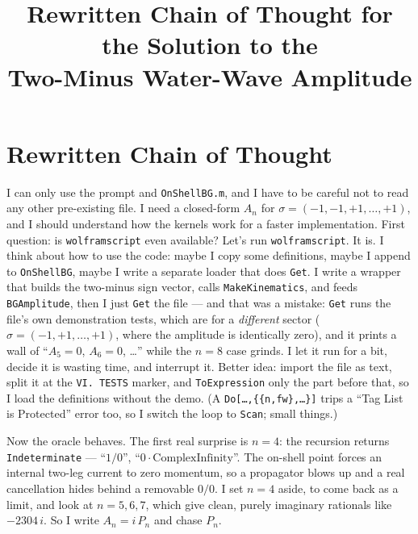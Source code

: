 \documentclass{article}
\title{Rewritten Chain of Thought for the Solution to the\\
Two-Minus Water-Wave Amplitude}
\author{}
\date{}
\begin{document}
\maketitle


\section*{Rewritten Chain of Thought}

I can only use the prompt and \texttt{OnShellBG.m}, and I have to be careful not
to read any other pre-existing file. I need a closed-form $A_n$ for
$\sigma=(-1,-1,+1,\dots,+1)$, and I should understand how the kernels work for a
faster implementation. First question: is \texttt{wolframscript} even available?
Let's run \texttt{wolframscript}. It is. I think about how to use the code:
maybe I copy some definitions, maybe I append to \texttt{OnShellBG}, maybe I
write a separate loader that does \texttt{Get}. I write a wrapper that builds the
two-minus sign vector, calls \texttt{MakeKinematics}, and feeds
\texttt{BGAmplitude}, then I just \texttt{Get} the file --- and that was a
mistake: \texttt{Get} runs the file's own demonstration tests, which are for a
\emph{different} sector ($\sigma=(-1,+1,\dots,+1)$, where the amplitude is
identically zero), and it prints a wall of ``$A_5=0$, $A_6=0$, \dots'' while the
$n=8$ case grinds. I let it run for a bit, decide it is wasting time, and
interrupt it. Better idea: import the file as text, split it at the
\texttt{VI.\ TESTS} marker, and \texttt{ToExpression} only the part before that,
so I load the definitions without the demo. (A \texttt{Do[\dots,\{\{n,fw\},\dots\}]}
trips a ``Tag List is Protected'' error too, so I switch the loop to
\texttt{Scan}; small things.)

Now the oracle behaves. The first real surprise is $n=4$: the recursion returns
\texttt{Indeterminate} --- ``$1/0$'', ``$0\cdot\text{ComplexInfinity}$''. The
on-shell point forces an internal two-leg current to zero momentum, so a
propagator blows up and a real cancellation hides behind a removable $0/0$. I set
$n=4$ aside, to come back as a limit, and look at $n=5,6,7$, which give clean,
purely imaginary rationals like $-2304\,i$. So I write $A_n=i\,P_n$ and chase
$P_n$.
\end{document}
